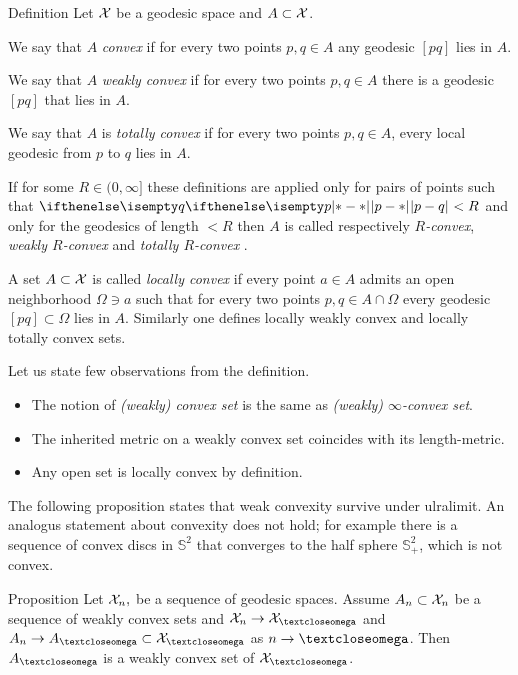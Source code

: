 \begin{thm}{Definition} 
\label{def:convex-set}
Let $\mathcal{X}$ be a geodesic space and $A\subset\spc{X}$.

We say that $A$ 
\emph{convex}%
if for every two points $p,q\in A$ any geodesic $[pq]$ lies in $A$.

We say that $A$ 
\emph{weakly convex}%
if for every two points $p,q\in A$
there is a geodesic $[pq]$ 
that lies in $A$.

We say that $A$ is \emph{totally convex}
if for every two points $p,q\in A$, every local geodesic from $p$ to $q$ lies in $A$.

If for some $R\in (0,\infty]$ these definitions are applied only for pairs of points such that $\dist{p}{q}{}<R$ and only for the geodesics of length $<R$
then $A$ is called respectively 
\emph{$R$-convex},
\emph{weakly  $R$-convex}%
and \emph{totally  $R$-convex}
.

A set $A\subset\spc{X}$ is called 
\emph{locally convex}
if every point $a\in A$ admits an open neighborhood $\Omega\ni a$
such that for every two points $p,q\in A\cap\Omega$ every geodesic $[pq]\subset \Omega$ lies in $A$.
Similarly one defines  locally weakly convex and locally totally convex sets. %
\end{thm}

 Let us state few observations from the definition.
\begin{itemize}
\item The notion of \emph{(weakly) convex set} is the same as \emph{(weakly) $\infty$-convex set}.
\item The inherited metric on a weakly convex set coincides with its length-metric.
\item Any open set is locally convex by definition.
\end{itemize}

The following proposition states that weak convexity survive under ulralimit.
An analogus statement about convexity does not hold;
for example there is a sequence of convex discs in $\mathbb{S}^2$ that converges to the half sphere $\mathbb{S}^2_+$, which is not convex.

\begin{thm}{Proposition}\label{prop:weak-convex-stable}
Let $\mathcal{X}_n,$ be a sequence of geodesic spaces.
Assume $A_n\subset \spc{X}_n$ be a sequence of weakly convex sets and 
$\spc{X}_n\to \spc{X}_\o$ and $A_n\to A_\o\subset \spc{X}_\o$ as $n\to\o$.
Then $A_\o$ is a weakly convex set of $\spc{X}_\o$.
\end{thm}

